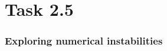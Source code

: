 \documentclass{beamer}
\begin{document}
\section{Task 2.5}
\begin{frame}
	\frametitle{Exploring numerical instabilities}
\end{frame}


%
%

\end{document}
